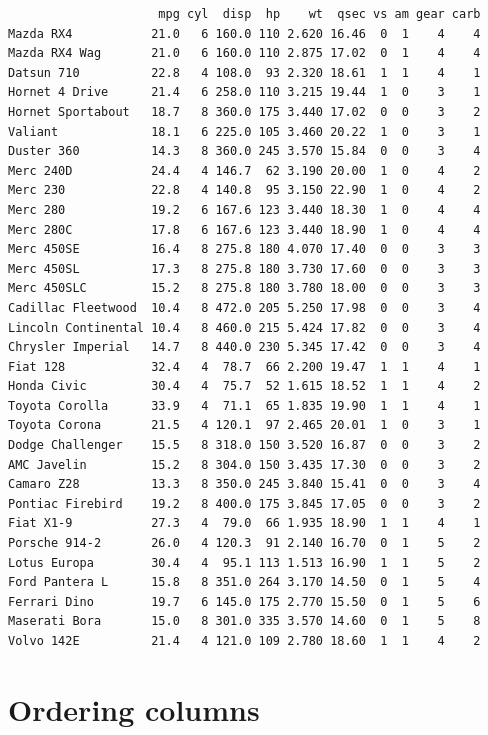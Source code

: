 \documentclass[
]{article}
\begin{document}
\begin{verbatim}
                     mpg cyl  disp  hp    wt  qsec vs am gear carb
Mazda RX4           21.0   6 160.0 110 2.620 16.46  0  1    4    4
Mazda RX4 Wag       21.0   6 160.0 110 2.875 17.02  0  1    4    4
Datsun 710          22.8   4 108.0  93 2.320 18.61  1  1    4    1
Hornet 4 Drive      21.4   6 258.0 110 3.215 19.44  1  0    3    1
Hornet Sportabout   18.7   8 360.0 175 3.440 17.02  0  0    3    2
Valiant             18.1   6 225.0 105 3.460 20.22  1  0    3    1
Duster 360          14.3   8 360.0 245 3.570 15.84  0  0    3    4
Merc 240D           24.4   4 146.7  62 3.190 20.00  1  0    4    2
Merc 230            22.8   4 140.8  95 3.150 22.90  1  0    4    2
Merc 280            19.2   6 167.6 123 3.440 18.30  1  0    4    4
Merc 280C           17.8   6 167.6 123 3.440 18.90  1  0    4    4
Merc 450SE          16.4   8 275.8 180 4.070 17.40  0  0    3    3
Merc 450SL          17.3   8 275.8 180 3.730 17.60  0  0    3    3
Merc 450SLC         15.2   8 275.8 180 3.780 18.00  0  0    3    3
Cadillac Fleetwood  10.4   8 472.0 205 5.250 17.98  0  0    3    4
Lincoln Continental 10.4   8 460.0 215 5.424 17.82  0  0    3    4
Chrysler Imperial   14.7   8 440.0 230 5.345 17.42  0  0    3    4
Fiat 128            32.4   4  78.7  66 2.200 19.47  1  1    4    1
Honda Civic         30.4   4  75.7  52 1.615 18.52  1  1    4    2
Toyota Corolla      33.9   4  71.1  65 1.835 19.90  1  1    4    1
Toyota Corona       21.5   4 120.1  97 2.465 20.01  1  0    3    1
Dodge Challenger    15.5   8 318.0 150 3.520 16.87  0  0    3    2
AMC Javelin         15.2   8 304.0 150 3.435 17.30  0  0    3    2
Camaro Z28          13.3   8 350.0 245 3.840 15.41  0  0    3    4
Pontiac Firebird    19.2   8 400.0 175 3.845 17.05  0  0    3    2
Fiat X1-9           27.3   4  79.0  66 1.935 18.90  1  1    4    1
Porsche 914-2       26.0   4 120.3  91 2.140 16.70  0  1    5    2
Lotus Europa        30.4   4  95.1 113 1.513 16.90  1  1    5    2
Ford Pantera L      15.8   8 351.0 264 3.170 14.50  0  1    5    4
Ferrari Dino        19.7   6 145.0 175 2.770 15.50  0  1    5    6
Maserati Bora       15.0   8 301.0 335 3.570 14.60  0  1    5    8
Volvo 142E          21.4   4 121.0 109 2.780 18.60  1  1    4    2
\end{verbatim}

\hypertarget{ordering-columns}{%
\section{Ordering columns}\label{ordering-columns}}
\end{document}
